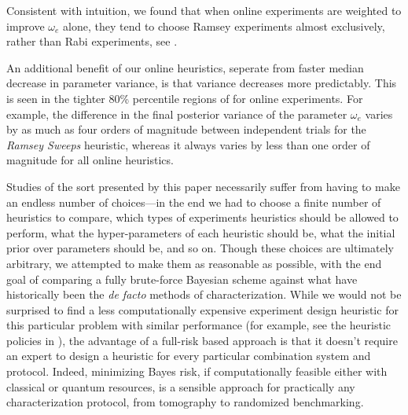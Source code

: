 \documentclass[aps,nofootinbib,twocolumn,superscriptaddress]{revtex4}
\begin{document}
Consistent with intuition, we found that when online experiments are weighted
to improve $\omega_e$ alone, they tend to choose Ramsey experiments almost
exclusively, rather than Rabi experiments, see
.

An additional benefit of our online heuristics, seperate from faster
median decrease in parameter variance, is that variance decreases more
predictably.
This is seen in the tighter 80\% percentile regions of
 for online experiments.
For example, the difference in the final posterior variance of the parameter
$\omega_e$ varies by as much as four orders of magnitude between
independent trials for the \emph{Ramsey Sweeps} heuristic, whereas it
always varies by less than one order of magnitude for all online heuristics.

Studies of the sort presented by this paper necessarily suffer from having to
make an endless number of choices---in the end we had to choose a
finite number of heuristics to compare, which types of experiments heuristics
should be allowed to perform, what the hyper-parameters of each heuristic
should be, what the initial prior over parameters should be, and so on. Though these choices are ultimately arbitrary, we attempted to make them
as reasonable as possible, with the end goal of comparing a fully brute-force
Bayesian scheme against what have historically been the \emph{de facto}
methods of characterization.
While we would not be surprised to find a less computationally expensive
experiment design heuristic for this particular problem
with similar performance (for example, see
the heuristic policies in \cite{stenberg_characterization_2016}),
the advantage of a full-risk based approach is that it doesn't require an
expert to design a heuristic for every particular combination system and
protocol.
Indeed, minimizing Bayes risk, if computationally feasible either with
classical or quantum resources, is a sensible approach for practically
any characterization protocol, from tomography to randomized benchmarking.

\end{document}
